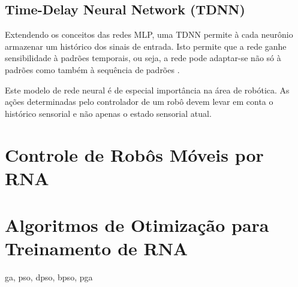 \subsection{Time-Delay Neural Network (TDNN)}

Extendendo os conceitos das redes MLP, uma TDNN permite à cada neurônio armazenar um
histórico dos sinais de entrada. Isto permite que a rede ganhe sensibilidade à padrões temporais, ou seja, a rede pode adaptar-se não só à padrões como também à sequência de padrões \cite{kaiser94tdnn}.

Este modelo de rede neural é de especial importância na área de robótica. As ações determinadas pelo controlador de um robô devem levar em conta o histórico sensorial e não apenas o estado sensorial atual.

\section{Controle de Robôs Móveis por RNA}



\section{Algoritmos de Otimização para Treinamento de RNA}
\label{optimization-algorithms}

ga, pso, dpso, bpso, pga